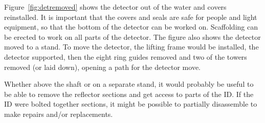 Figure~\ref{fig:detremoved} shows the detector out of the water and covers reinstalled. It is important that
 the covers and seals are safe for people and light equipment, so that the bottom of the detector can be
 worked on. Scaffolding can be erected to work on all parts of the detector. The figure also shows the
 detector moved to a stand. To move the detector, the lifting frame would be installed, the detector
 supported, then the eight ring guides removed and two of the towers removed (or laid down), opening
 a path for the detector move.

Whether above the shaft or on a separate stand, it would probably
 be useful to be able to remove the reflector sections and get access to parts of the ID.
 If the ID were bolted together sections, it might be possible to partially disassemble to make repairs and/or replacements.

